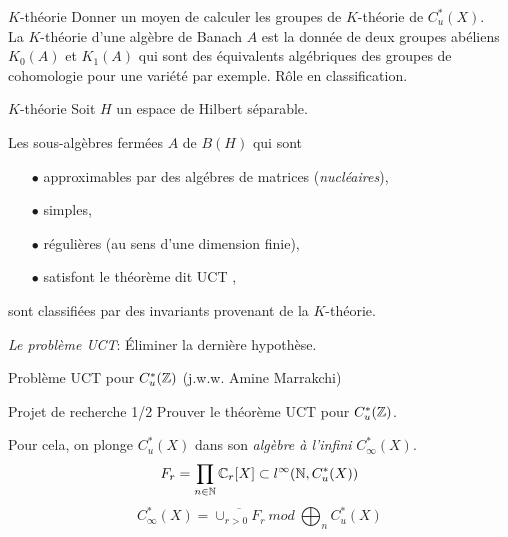 \begin{frame}{$K$-th\'eorie}
Donner un moyen de calculer les groupes de $K$-th\'eorie de $C^*_u(X)$.\\
\vfill
La $K$-th\'eorie d'une alg\`ebre de Banach $A$ est la donn\'ee de deux groupes ab\'eliens $K_0(A)$ et $K_1(A)$ qui sont des \'equivalents alg\'ebriques des groupes de cohomologie pour une vari\'et\'e par exemple.  
\vfill
R\^{o}le en classification.\\
\vfill

\end{frame}

\begin{frame}{$K$-th\'eorie}
Soit $H$ un espace de Hilbert s\'eparable.
\vfill
\begin{theorem}
Les sous-alg\`ebres ferm\'ees $A$ de $B(H)$ qui sont
\begin{itemize}
\item[$\bullet$] approximables par des alg\'ebres de matrices (\textit{nucl\'eaires}),
\item[$\bullet$] simples,
\item[$\bullet$] r\'eguli\`eres (au sens d'une dimension finie),
\item[$\bullet$] satisfont le th\'eor\`eme dit UCT ,
\end{itemize}
sont classifi\'ees par des invariants provenant de la $K$-th\'eorie.
\end{theorem} 
\vfill
\textit{Le probl\`eme UCT}: \'Eliminer la derni\`ere hypoth\`ese.
\end{frame}

\begin{frame}{Probl\`eme UCT pour $C^*_u(\mathbb Z)$ (j.w.w. Amine Marrakchi)}
\begin{block}{Projet de recherche 1/2}
Prouver le th\'eor\`eme UCT pour $C^*_u(\mathbb Z)$.
\end{block}
\vfill
Pour cela, on plonge $C^*_u(X)$ dans son \textit{alg\`ebre \`a l'infini} $C^*_\infty(X)$.
\[ F_r = \prod_{n\in \mathbb N} \mathbb C_r[X] \subset l^\infty(\mathbb N , C^*_u(X))\]
\[C^*_\infty(X) = \overline{\cup_{r>0 } F_r} \ mod \ \bigoplus_n C^*_u(X)\]
\end{frame}

